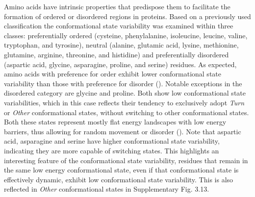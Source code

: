 Amino acids have intrinsic properties that predispose them to facilitate the formation of ordered or disordered regions in proteins. Based on a previously used classification \cite{cilia_protein_2013} the conformational state variability was examined within three classes: preferentially ordered (cysteine, phenylalanine, isoleucine, leucine, valine, tryptophan, and tyrosine), neutral (alanine, glutamic acid, lysine, methionine, glutamine, arginine, threonine, and histidine) and preferentially disordered (aspartic acid, glycine,  asparagine, proline, and serine) residues. As expected, amino acids with preference for order exhibit lower conformational state variability than those with preference for disorder (). Notable exceptions in the disordered category are glycine and proline. Both show low conformational state variabilities, which in this case reflects their tendency to exclusively adopt \textit{Turn} or \textit{Other} conformational states, without switching to other conformational states. Both these states represent mostly flat energy landscapes with low energy barriers, thus allowing for random movement or disorder (). Note that aspartic acid, asparagine and serine have higher conformational state variability, indicating they are more capable of switching states. This highlights an interesting feature of the conformational state variability, residues that remain in the same low energy conformational state, even if that conformational state is effectively dynamic, exhibit low conformational state variability. This is also reflected in \textit{Other} conformational states in Supplementary Fig. 3.13.

